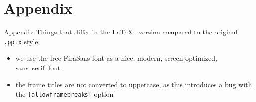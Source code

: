 \documentclass[aspectratio=169]{beamer}
\begin{document}
\section{Appendix}
\begin{frame}{Appendix}
    Things that differ in the \LaTeX~ version compared to the original \texttt{.pptx} style:
        \begin{itemize}
            \item we use the free FiraSans font as a nice, modern, screen optimized, sans~serif~font
            \item the frame titles are not converted to uppercase, as this introduces a bug with the \texttt{[allowframebreaks]} option
        \end{itemize}
\end{frame}
\end{document}
